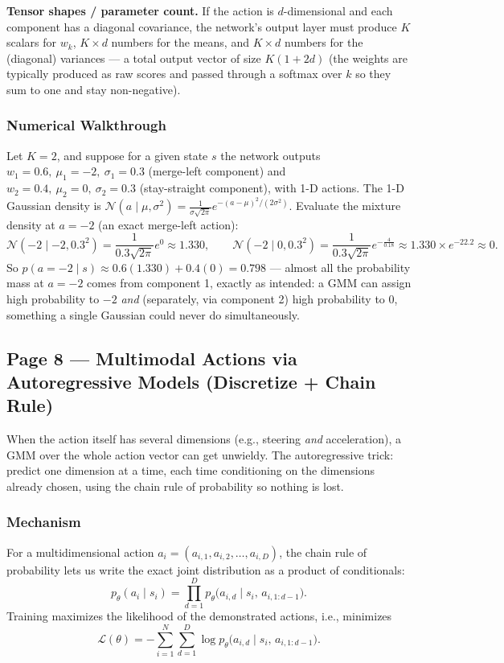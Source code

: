 \textbf{Tensor shapes / parameter count.} If the action is $d$-dimensional and each component has a diagonal covariance, the network's output layer must produce $K$ scalars for $w_k$, $K \times d$ numbers for the means, and $K \times d$ numbers for the (diagonal) variances --- a total output vector of size $K(1 + 2d)$ (the weights are typically produced as raw scores and passed through a softmax over $k$ so they sum to one and stay non-negative).

\subsubsection*{Numerical Walkthrough}

Let $K=2$, and suppose for a given state $s$ the network outputs $w_1 = 0.6,\ \mu_1=-2,\ \sigma_1=0.3$ (merge-left component) and $w_2=0.4,\ \mu_2=0,\ \sigma_2=0.3$ (stay-straight component), with 1-D actions. The 1-D Gaussian density is $\mathcal N(a\mid \mu,\sigma^2) = \frac{1}{\sigma\sqrt{2\pi}} e^{-(a-\mu)^2/(2\sigma^2)}$. Evaluate the mixture density at $a = -2$ (an exact merge-left action):
\[
\mathcal{N}(-2 \mid -2, 0.3^2) = \frac{1}{0.3\sqrt{2\pi}} e^{0} \approx 1.330, \qquad
\mathcal{N}(-2 \mid 0, 0.3^2) = \frac{1}{0.3\sqrt{2\pi}} e^{-\frac{4}{0.18}} \approx 1.330 \times e^{-22.2} \approx 0.
\]
So $p(a=-2 \mid s) \approx 0.6(1.330) + 0.4(0) = 0.798$ --- almost all the probability mass at $a=-2$ comes from component 1, exactly as intended: a GMM can assign high probability to $-2$ \emph{and} (separately, via component 2) high probability to $0$, something a single Gaussian could never do simultaneously.

\subsection*{Page 8 --- Multimodal Actions via Autoregressive Models (Discretize + Chain Rule)}

When the action itself has several dimensions (e.g., steering \emph{and} acceleration), a GMM over the whole action vector can get unwieldy. The autoregressive trick: predict one dimension at a time, each time conditioning on the dimensions already chosen, using the chain rule of probability so nothing is lost.

\subsubsection*{Mechanism}

For a multidimensional action $a_i = (a_{i,1}, a_{i,2}, \dots, a_{i,D})$, the chain rule of probability lets us write the exact joint distribution as a product of conditionals:
\[
p_\theta(a_i \mid s_i) = \prod_{d=1}^{D} p_\theta\big(a_{i,d} \mid s_i,\, a_{i,1:d-1}\big).
\]
Training maximizes the likelihood of the demonstrated actions, i.e., minimizes
\[
\mathcal{L}(\theta) = -\sum_{i=1}^{N} \sum_{d=1}^{D} \log p_\theta\big(a_{i,d} \mid s_i,\, a_{i,1:d-1}\big).
\]

